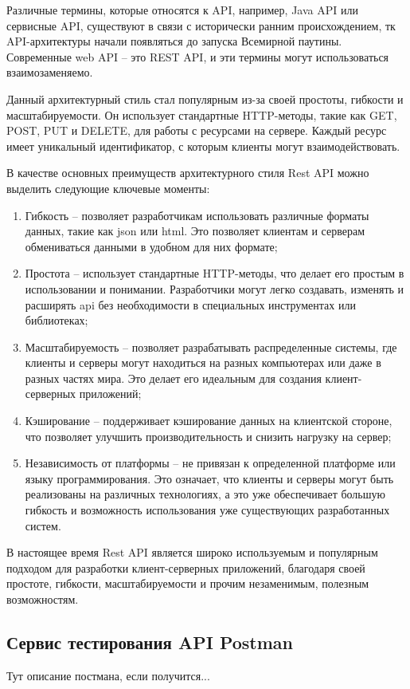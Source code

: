 \documentclass[master, och, diploma]{SCWorks}
\begin{document}
Различные термины, которые относятся к API, например, Java API или сервисные API, существуют в связи с исторически ранним происхождением, тк API-архитектуры начали появляться до запуска Всемирной паутины. Современные web API – это REST API, и эти термины могут использоваться взаимозаменяемо.

Данный архитектурный стиль стал популярным из-за своей простоты, гибкости и масштабируемости. Он использует стандартные HTTP-методы, такие как GET, POST, PUT и DELETE, для работы с ресурсами на сервере. Каждый ресурс имеет уникальный идентификатор, с которым клиенты могут взаимодействовать.

В качестве основных преимуществ архитектурного стиля Rest API можно выделить следующие ключевые моменты:
\begin{enumerate}
    \item Гибкость – позволяет разработчикам использовать различные форматы данных, такие как json или html. Это позволяет клиентам и серверам обмениваться данными в удобном для них формате;
    \item Простота – использует стандартные HTTP-методы, что делает его простым в использовании и понимании. Разработчики могут легко создавать, изменять и расширять api без необходимости в специальных инструментах или библиотеках;
    \item Масштабируемость – позволяет разрабатывать распределенные системы, где клиенты и серверы могут находиться на разных компьютерах или даже в разных частях мира. Это делает его идеальным для создания клиент-серверных приложений;
    \item Кэширование – поддерживает кэширование данных на клиентской стороне, что позволяет улучшить производительность и снизить нагрузку на сервер;
    \item Независимость от платформы – не привязан к определенной платформе или языку программирования. Это означает, что клиенты и серверы могут быть реализованы на различных технологиях, а это уже обеспечивает большую гибкость и возможность использования уже существующих разработанных систем.\cite{Masse_rest}
\end{enumerate}

В настоящее время Rest API является широко используемым и популярным подходом для разработки клиент-серверных приложений, благодаря своей простоте, гибкости, масштабируемости и прочим незаменимым, полезным возможностям.

\subsection{Сервис тестирования API Postman}
Тут описание постмана, если получится...
\end{document}
